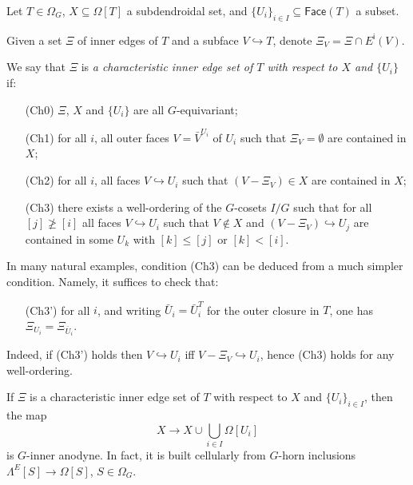 \documentclass[a4paper,10pt,draft]{article}%
\numberwithin{equation}{section}%
\numberwithin{figure}{section}
\begin{document}
\begin{definition}\label{CHAREDGE DEF}
Let $T \in \Omega_G$, $X \subseteq \Omega[T]$ a subdendroidal set, and $\{U_i\}_{i \in I} \subseteq \mathsf{Face}(T)$ a subset.

Given a set $\Xi$ of inner edges of $T$ and a subface $V \hookrightarrow T$, denote $\Xi_V = \Xi \cap E^{\mathsf{i}}(V)$.

We say that $\Xi$ is \textit{a characteristic inner edge set of $T$ with respect to $X$ and $\{U_i\}$} if:
\begin{itemize}
	\item[(Ch0)] $\Xi$, $X$ and $\{U_i\}$ are all $G$-equivariant; 
	\item[(Ch1)] for all $i$, all outer faces $V = \bar{V}^{U_i}$
	of $U_i$ such that $\Xi_{V} = \emptyset$
	are contained in $X$;
	\item[(Ch2)] for all $i$, all faces
	$V \hookrightarrow U_i$ such that $(V-\Xi_V) \in X$
	are contained in $X$;
	\item[(Ch3)] there exists a well-ordering of the $G$-cosets $I/G$ such that for all $[j] \not \geq [i]$ 
	all faces $V \hookrightarrow U_i$ such that 
	$V \not \in X$ and $(V-\Xi_V) \hookrightarrow U_j$
	are contained in some $U_k$ with $[k]\leq[j]$ or $[k]<[i]$.
\end{itemize}
\end{definition}

\begin{remark}
	In many natural examples, 
	condition (Ch3) can be deduced from a much simpler condition. Namely, it suffices to check that:
	\begin{itemize}
		\item[(Ch3')] for all $i$, and writing $\bar{U}_i=\bar{U}_i^T$ for the outer closure in $T$, one has
		$\Xi_{U_i}=\Xi_{\bar{U}_i}$.
	\end{itemize}
Indeed, if (Ch3') holds then $V\hookrightarrow U_i$
iff $V - \Xi_V\hookrightarrow U_i$,
hence (Ch3) holds for any well-ordering.
\end{remark}

\begin{lemma}\label{CHAREDGE LEM}
If $\Xi$ is a characteristic inner edge set of $T$ with respect to $X$ and $\{U_i\}_{i\in I}$, then the map
\begin{equation}\label{CHARLEM EQ}
	X \to X \cup \bigcup_{i \in I} \Omega[U_i]
\end{equation}
is $G$-inner anodyne. In fact, it is built cellularly from $G$-horn inclusions $\Lambda^E[S] \to \Omega[S]$, $S \in \Omega_G$.
\end{lemma}
\end{document}
